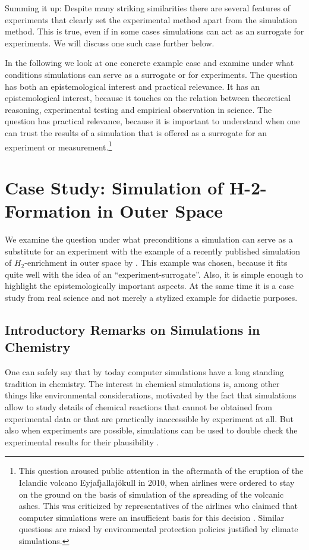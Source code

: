 \documentclass[12pt, a4paper]{article}
\numberwithin{equation}{section}
\begin{document}
Summing it up: Despite many striking similarities there are several
features of experiments that clearly set the experimental method apart
from the simulation method. This is true, even if in some cases
simulations can act as an surrogate for experiments. We will discuss
one such case further below.

In the following we look at one concrete example case and examine
under what conditions simulations can serve as a surrogate or for
experiments. The question has both an epistemological interest and
practical relevance.  It has an epistemological interest, because it
touches on the relation between theoretical reasoning, experimental testing
and empirical observation in science. The question has practical
relevance, because it is important to understand when one can trust
the results of a simulation that is offered as a surrogate for an
experiment or measurement.\footnote{This question aroused public
  attention in the aftermath of the eruption of the Iclandic volcano
  Eyjafjallajökull in 2010, when airlines were ordered to stay on the ground
  on the basis of simulation of the spreading of the volcanic
  ashes. This was criticized by representatives of the airlines who
  claimed that computer simulations were an insufficient basis for
  this decision \citep{tagesschau:2010-04-18}. Similar questions are
  raised by environmental protection policies justified by climate
  simulations.}


\section{Case Study: Simulation of H-2-Formation in Outer Space}

We examine the question under what preconditions a simulation can
serve as a substitute for an experiment with the example of a recently
published simulation of $H_2$-enrichment in outer space by
\citet{goumans-kaestner:2010}. This example was chosen, because it fits
quite well with the idea of an ``experiment-surrogate''.  Also, it is
simple enough to highlight the epistemologically important aspects. At
the same time it is a case study from real science and not merely a
stylized example for didactic purposes.

\subsection{Introductory Remarks on Simulations in Chemistry}

One can safely say that by today computer simulations have a long
standing tradition in chemistry. The interest in chemical simulations
is, among other things like environmental considerations, motivated by
the fact that simulations allow to study details of chemical reactions
that cannot be obtained from experimental data or that are practically
inaccessible by experiment at all. But also when experiments are
possible, simulations can be used to double check the experimental
results for their plausibility \citep{alexander-etal:2002,wang-etal:2008}.
\end{document}
